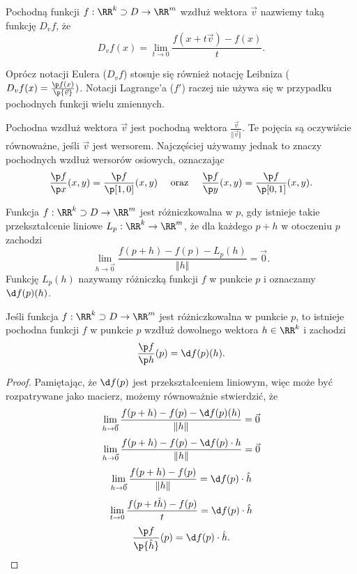 \begin{definition}
    Pochodną funkcji $f : \RR^k \supset D \to \RR^m$ wzdłuż wektora $\vec{v}$ nazwiemy taką funkcję $D_v f$, że
    \[ D_v f(x) = \lim_{t\to 0}\frac{f(x + t\vec{v}) - f(x)}{t}. \]
\end{definition}

Oprócz notacji Eulera ($D_v f$) stosuje się również notację Leibniza ($D_v f(x) = \frac{\p f(x)}{\p{\vec{v}}})$. Notacji Lagrange'a ($f'$) raczej nie używa się w przypadku pochodnych funkcji wielu zmiennych.

Pochodna wzdłuż wektora $\vec{v}$ jest pochodną  wektora $\frac{\vec{v}}{\Vert\vec{v}\Vert}$. Te pojęcia są oczywiście równoważne, jeśli $\vec{v}$ jest wersorem. Najczęściej używamy jednak  to znaczy pochodnych wzdłuż wersorów osiowych, oznaczając
\[ \frac{\p f}{\p x}(x, y) = \frac{\p f}{\p [1, 0]}(x, y) \hspace{1em}\text{ oraz }\hspace{1em} \frac{\p f}{\p y}(x, y) = \frac{\p f}{\p [0, 1]}(x, y). \]

\begin{definition}[różniczka]
    Funkcja $f : \RR^k \supset D \to \RR^m$ jest różniczkowalna w $p$, gdy istnieje takie przekształcenie liniowe $L_{p} : \RR^k \to \RR^m$, że dla każdego $p + h$ w otoczeniu $p$ zachodzi
    \[ \lim_{h\to\vec{0}} \frac{f(p + h) - f(p) - L_{p}(h)}{\Vert h \Vert} = \vec{0}. \]
    Funkcję $L_{p}(h)$ nazywamy różniczką funkcji $f$ w punkcie $p$ i oznaczamy $\d f(p)(h)$.
\end{definition}

\begin{theorem}
    Jeśli funkcja $f : \RR^k \supset D \to \RR^m$ jest różniczkowalna w punkcie $p$, to istnieje pochodna funkcji $f$ w punkcie $p$ wzdłuż dowolnego wektora $h \in \RR^k$ i zachodzi
    \[ \frac{\p f}{\p h}(p) = \d f(p)(h). \]
\end{theorem}
\begin{proof}
    Pamiętając, że $\d f(p)$ jest przekształceniem liniowym, więc może być rozpatrywane jako macierz, możemy równoważnie stwierdzić, że
    \[ \lim_{h\to\vec{0}} \frac{f(p + h) - f(p) - \d f(p)(h)}{\Vert h \Vert} = \vec{0} \]
    \[ \lim_{h\to\vec{0}} \frac{f(p + h) - f(p) - \d f(p) \cdot h}{\Vert h \Vert} = \vec{0} \]
    \[ \lim_{h\to\vec{0}} \frac{f(p + h) - f(p)}{\Vert h \Vert} = \d f(p)\cdot\hat{h} \]
    \[ \lim_{t\to 0} \frac{f(p + t\hat{h}) - f(p)}{t} = \d f(p)\cdot\hat{h} \]
    \[ \frac{\p f}{\p{\hat{h}}}(p) = \d f(p)\cdot\hat{h}. \]
\end{proof}

